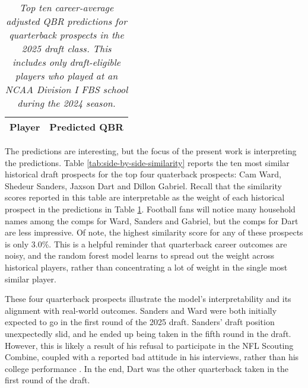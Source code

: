 \documentclass{article}
\begin{document}
\begin{table}[H]
  \centering
  \begin{tabular}{l|r}
    Player & Predicted QBR\\
    \hline
    
  \end{tabular}
  \caption{\textit{Top ten career-average adjusted QBR predictions for quarterback prospects in the 2025 draft class. This includes only draft-eligible players who played at an NCAA Division I FBS school during the 2024 season.}}
  \label{tab:top-ten}
\end{table}

The predictions are interesting, but the focus of the present work is interpreting the predictions. Table \ref{tab:side-by-side-similarity} reports the ten most similar historical draft prospects for the top four quaterback prospects: Cam Ward, Shedeur Sanders, Jaxson Dart and Dillon Gabriel. Recall that the similarity scores reported in this table are interpretable as the weight of each historical prospect in the predictions in Table \ref{tab:top-ten}. Football fans will notice many household names among the comps for Ward, Sanders and Gabriel, but the comps for Dart are less impressive. Of note, the highest similarity score for any of these prospects is only 3.0\%. This is a helpful reminder that quarterback career outcomes are noisy, and the random forest model learns to spread out the weight across historical players, rather than concentrating a lot of weight in the single most similar player.

These four quarterback prospects illustrate the model's interpretability and its alignment with real-world outcomes. Sanders and Ward were both initially expected to go in the first round of the 2025 draft. Sanders' draft position unexpectedly slid, and he ended up being taken in the fifth round in the draft. However, this is likely a result of his refusal to participate in the NFL Scouting Combine, coupled with a reported bad attitude in his interviews, rather than his college performance \citep{mckenna_what_nodate}. In the end, Dart was the other quarterback taken in the first round of the draft.

\begin{table}[H]
  \caption{\textit{Top ten similarity scores for each of the top four quarterback prospects in the 2025 NFL draft. The similarity score is the contribution made by each historical prospect to the weighted average which constitutes the reference prospect's prediction in the random forest model.}}
  \label{tab:side-by-side-similarity}
\end{table}
\end{document}
